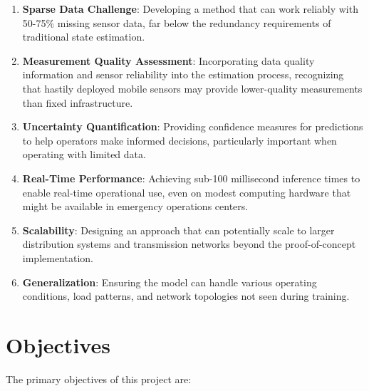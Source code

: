 \documentclass[12pt,a4paper]{report}
\begin{document}
\begin{enumerate}
    \item \textbf{Sparse Data Challenge}: Developing a method that can work reliably with 50-75\% missing sensor data, far below the redundancy requirements of traditional state estimation.
    
    \item \textbf{Measurement Quality Assessment}: Incorporating data quality information and sensor reliability into the estimation process, recognizing that hastily deployed mobile sensors may provide lower-quality measurements than fixed infrastructure.
    
    \item \textbf{Uncertainty Quantification}: Providing confidence measures for predictions to help operators make informed decisions, particularly important when operating with limited data.
    
    \item \textbf{Real-Time Performance}: Achieving sub-100 millisecond inference times to enable real-time operational use, even on modest computing hardware that might be available in emergency operations centers.
    
    \item \textbf{Scalability}: Designing an approach that can potentially scale to larger distribution systems and transmission networks beyond the proof-of-concept implementation.
    
    \item \textbf{Generalization}: Ensuring the model can handle various operating conditions, load patterns, and network topologies not seen during training.
\end{enumerate}

\section{Objectives}

The primary objectives of this project are:
\end{document}
